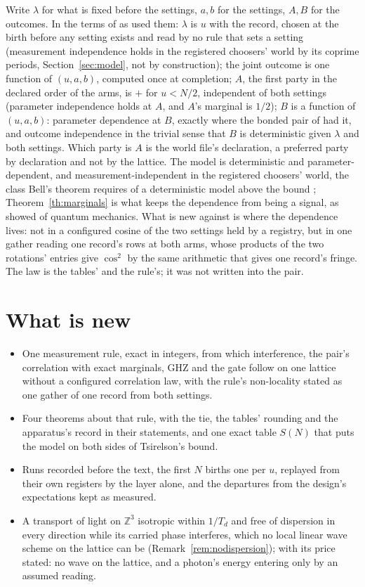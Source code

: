 \documentclass[11pt]{article}
\theoremstyle{definition}
\newcommand{\Z}{\mathbb{Z}}
\begin{document}
Write $\lambda$ for what is fixed before the settings, $a, b$ for the
settings, $A, B$ for the outcomes. In the terms of \cite{jarrett1984,shimony1986}
as \cite{paper1} used them: $\lambda$ is $u$ with the record, chosen at
the birth before any setting exists and read by no rule that sets a
setting (measurement independence holds in the registered choosers'
world by its coprime periods, Section~\ref{sec:model}, not by
construction); the joint
outcome is one function of $(u, a, b)$, computed once at completion;
$A$, the first party in the declared order of the arms, is $+$ for
$u < N/2$, independent of both settings (parameter independence holds
at $A$, and $A$'s marginal is $1/2$); $B$ is a function of $(u, a, b)$:
parameter dependence at $B$, exactly where the bonded pair of
\cite{paper1} had it, and outcome independence in the trivial sense that
$B$ is deterministic given $\lambda$ and both settings. Which party is
$A$ is the world file's declaration, a preferred party by declaration
and not by the lattice. The model is
deterministic and parameter-dependent, and measurement-independent in the
registered choosers' world, the class
Bell's theorem requires of a deterministic model above the bound
\cite{bell1964,chsh1969}; Theorem~\ref{th:marginals} is what keeps the
dependence from being a signal, as \cite{grw1980} showed of quantum
mechanics. What is new against \cite{paper1} is where the dependence
lives: not in a configured cosine of the two settings held by a registry,
but in one gather reading one record's rows at both arms, whose products
of the two rotations' entries give $\cos^2$ by the same arithmetic that
gives one record's fringe. The law is the tables' and the rule's; it was
not written into the pair.

\section{What is new}\label{sec:new}

\begin{itemize}
\item One measurement rule, exact in integers, from which interference,
the pair's correlation with exact marginals, GHZ and the gate follow on
one lattice without a configured correlation law, with the rule's
non-locality stated as one gather of one record from both settings.
\item Four theorems about that rule, with the tie, the tables' rounding
and the apparatus's record in their statements, and one exact table
$S(N)$ that puts the model on both sides of Tsirelson's bound.
\item Runs recorded before the text, the first $N$ births one per $u$, replayed
from their own registers by the layer alone, and the departures from
the design's expectations kept as measured.
\item A transport of light on $\Z^3$ isotropic within $1/T_d$ and free
of dispersion in every direction while its carried phase interferes,
which no local linear wave scheme on the lattice can be
(Remark~\ref{rem:nodispersion}); with its price stated: no wave on the
lattice, and a photon's energy entering only by an assumed reading.
\end{itemize}
\end{document}
